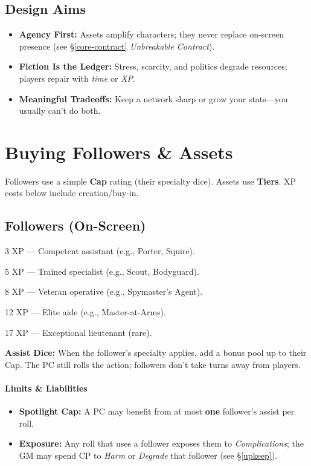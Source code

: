 \documentclass[12pt]{article}
\begin{document}
\subsection*{Design Aims}
\begin{itemize}
  \item \textbf{Agency First:} Assets amplify characters; they never replace on-screen presence (see \S\ref{core-contract} \emph{Unbreakable Contract}).
  \item \textbf{Fiction Is the Ledger:} Stress, scarcity, and politics degrade resources; players repair with \emph{time} or \emph{XP}.
  \item \textbf{Meaningful Tradeoffs:} Keep a network sharp or grow your stats—you usually can’t do both.
\end{itemize}

\section{Buying Followers \& Assets}
Followers use a simple \textbf{Cap} rating (their specialty dice). Assets use \textbf{Tiers}. XP costs below include creation/buy-in.

\subsection{Followers (On-Screen)}
\begin{description}[leftmargin=3.2cm]
  \item[Cap 1] 3 XP — Competent assistant (e.g., Porter, Squire).
  \item[Cap 2] 5 XP — Trained specialist (e.g., Scout, Bodyguard).
  \item[Cap 3] 8 XP — Veteran operative (e.g., Spymaster’s Agent).
  \item[Cap 4] 12 XP — Elite aide (e.g., Master-at-Arms).
  \item[Cap 5] 17 XP — Exceptional lieutenant (rare).
\end{description}
\textbf{Assist Dice:} When the follower’s specialty applies, add a bonus pool up to their Cap. The PC still rolls the action; followers don’t take turns away from players.

\paragraph{Limits \& Liabilities}
\begin{itemize}
  \item \textbf{Spotlight Cap:} A PC may benefit from at most \textbf{one} follower’s assist per roll.
  \item \textbf{Exposure:} Any roll that uses a follower exposes them to \emph{Complications}; the GM may spend CP to \emph{Harm} or \emph{Degrade} that follower (see \S\ref{upkeep}).
\end{itemize}
\end{document}
